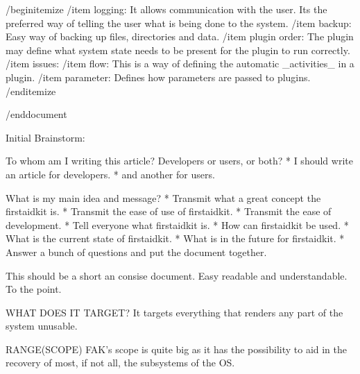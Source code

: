 /begin{itemize}
/item logging: It allows communication with the user.  Its the preferred way of telling the user what is being done to the system.
/item backup: Easy way of backing up files, directories and data.
/item plugin order: The plugin may define what system state needs to be present for the plugin to run correctly.
/item issues:
/item flow: This is a way of defining the automatic _activities_ in a plugin.
/item parameter: Defines how parameters are passed to plugins.
/end{itemize}

/end{document}

Initial Brainstorm:

To whom am I writing this article?  Developers or users, or both?
 * I should write an article for developers.
 * and another for users.

What is my main idea and message?
 * Transmit what a great concept the firstaidkit is.
 * Transmit the ease of use of firstaidkit.
 * Transmit the ease of development.
 * Tell everyone what firstaidkit is.
 * How can firstaidkit be used.
 * What is the current state of firstaidkit.
 * What is in the future for firstaidkit.
 * Answer a bunch of questions and put the document together.

This should be a short an consise document.  Easy readable and understandable.  To the point.



WHAT DOES IT TARGET?
It targets everything that renders any part of the system unusable.

RANGE(SCOPE)
FAK's scope is quite big as it has the possibility to aid in the recovery of most, if not all, the subsystems of the OS.
